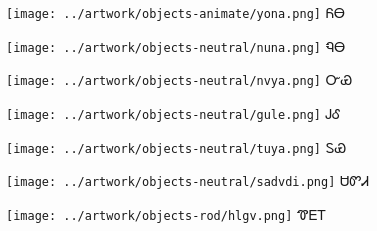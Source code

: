 \documentclass[avery5371]{flashcards}%
\begin{document}
\begin{flashcard}{
\texttt{[image: ../artwork/objects-animate/yona.png]}
}
\Huge ᏲᎾ
\end{flashcard}


\begin{flashcard}{
\texttt{[image: ../artwork/objects-neutral/nuna.png]}
}
\Huge ᏄᎾ
\end{flashcard}

\begin{flashcard}{
\texttt{[image: ../artwork/objects-neutral/nvya.png]}
}
\Huge ᏅᏯ
\end{flashcard}

\begin{flashcard}{
\texttt{[image: ../artwork/objects-neutral/gule.png]}
}
\Huge ᎫᎴ
\end{flashcard}

\begin{flashcard}{
\texttt{[image: ../artwork/objects-neutral/tuya.png]}
}
\Huge ᏚᏯ
\end{flashcard}

\begin{flashcard}{
\texttt{[image: ../artwork/objects-neutral/sadvdi.png]}
}
\Huge ᏌᏛᏗ
\end{flashcard}

\begin{flashcard}{
\texttt{[image: ../artwork/objects-rod/hlgv.png]}
}
\Huge ᏡᎬᎢ
\end{flashcard}
\end{document}
